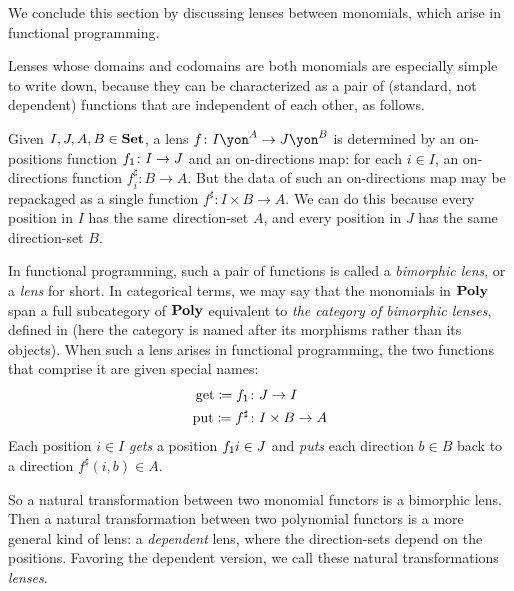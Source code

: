 \documentclass[Book-Poly]{subfiles}
\begin{document}

We conclude this section by discussing lenses between monomials, which arise in functional programming.

\begin{example} \label{subsec.poly.cat.morph.bimorphic-lens}
  Lenses whose domains and codomains are both monomials are especially simple to write down, because they can be characterized as a pair of (standard, not dependent) functions that are independent of each other, as follows.


  Given $I,J,A,B\in\mathbf{Set}$, a lens $f\colon I\yon^A\to J\yon^B$ is determined by an on-positions function $f_{\textsf{1}}\colon I\to J$ and an on-directions map: for each $i\in I$, an on-directions function $f^\sharp_i\colon B\to A$.
  But the data of such an on-directions map may be repackaged as a single function $f^\sharp\colon I\times B\to A$.
  We can do this because every position in $I$ has the same direction-set $A$, and every position in $J$ has the same direction-set $B$.

  In functional programming, such a pair of functions is called a \emph{bimorphic lens}, or a \emph{lens} for short.
  In categorical terms, we may say that the monomials in $\mathbf{Poly}$ span a full subcategory of $\mathbf{Poly}$ equivalent to \emph{the category of bimorphic lenses}, defined in \cite{hedges2018limits} (here the category is named after its morphisms rather than its objects).
  When such a lens arises in functional programming, the two functions that comprise it are given special names:
  \begin{equation}\label{eqn.bimorphic_lens}
    \begin{aligned}
      \mathrm{get}\coloneqq f_{\textsf{1}} &\colon J\to I\\
      \mathrm{put}\coloneqq f^\sharp &\colon I\times B\to A
    \end{aligned}
  \end{equation}
  Each position $i\in I$ \emph{gets} a position $f_{\textsf{1}}i\in J$ and \emph{puts} each direction $b\in B$ back to a direction $f^\sharp(i,b)\in A$.

  So a natural transformation between two monomial functors is a bimorphic lens.
  Then a natural transformation between two polynomial functors is a more general kind of lens: a \emph{dependent} lens, where the direction-sets depend on the positions.
  Favoring the dependent version, we call these natural transformations \emph{lenses}.
\end{example}
\end{document}
